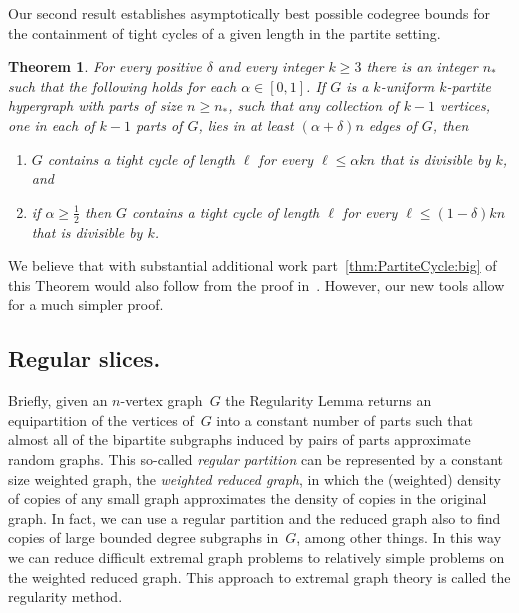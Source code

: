 \documentclass[12pt,a4paper]{amsart}
\def\itm#1{\rm ({#1})}
\def\itmit#1{\itm{\it #1\,}}
\def\abc{\itmit{\alph{*}}}
\newtheorem{theorem}{Theorem}%
\begin{document}
Our second result establishes asymptotically best possible codegree
bounds for the containment of tight cycles of a given length in the partite
setting.

\begin{theorem}\label{thm:PartiteCycle}
For every positive $\delta$ and every integer $k \ge 3$ there is an integer
 $n_{*}$ such that the following holds for each $\alpha\in[0,1]$. If $G$ is a $k$-uniform $k$-partite 
 hypergraph with parts of size $n\ge n_{*}$, such that any collection of $k-1$
 vertices, one in each of $k-1$ parts of $G$, lies in at least
$(\alpha+\delta)n$ edges of $G$, then
 \begin{enumerate}[label=\abc] 
 \item\label{thm:PartiteCycle:small} $G$ contains a tight cycle of length $\ell$ for every $\ell\le
   \alpha kn$ that is divisible by $k$, and
 \item\label{thm:PartiteCycle:big} if $\alpha\ge\frac{1}{2}$ then $G$ contains a tight cycle of length
   $\ell$ for every $\ell\le(1-\delta)kn$ that is divisible by $k$.
\end{enumerate}
\end{theorem}


We believe that with substantial additional work
part~\ref{thm:PartiteCycle:big} of this Theorem would also follow from the
proof in~\cite{RSHamSurvey}. However, our new tools allow for a much
simpler proof.

\subsection{Regular slices.} 
Briefly, given an $n$-vertex graph~$G$ the Regularity Lemma returns an
equipartition of the vertices of~$G$ into a constant number of parts such
that almost all of the bipartite subgraphs induced by pairs of parts
approximate random graphs. This so-called \emph{regular partition} can be represented by
a constant size weighted graph, the \emph{weighted reduced graph}, in
which the (weighted) density of copies of any small graph approximates the
density of copies in the original graph. 
In fact, we can use a regular partition and the reduced graph also to find
copies of large bounded degree subgraphs in~$G$, among other things. In this way we can reduce difficult extremal graph problems to relatively simple problems
on the weighted reduced graph. This
approach to extremal graph theory is called the regularity method.
\end{document}
